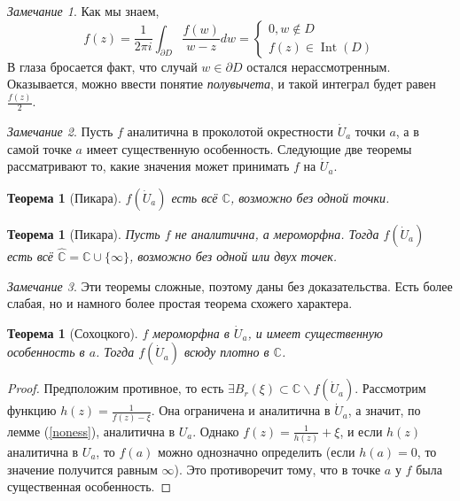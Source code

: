 \documentclass[12pt]{article}
\renewcommand{\C}{\mathbb{C}}
\newcommand{\Int}{\operatorname{Int}}
\newcommand{\union}{\cup}
\newcounter{cnt}
\theoremstyle{thmnote}
\newtheorem{theorem}[cnt]{Теорема}
\theoremstyle{remark}
\newtheorem*{remark}{Замечание}
\theoremstyle{defnote}
\begin{document}
\begin{remark}
    Как мы знаем,
    \begin{equation*}
        f(z) = \frac{1}{2 \pi i} \int_{\partial D} \frac{f(w)}{w - z} dw = \begin{cases}
            0, w \notin D \\ f(z) \in \Int(D)
        \end{cases}
    \end{equation*}
    В глаза бросается факт, что случай $w \in \partial D$ остался нерассмотренным. Оказывается, можно ввести понятие \textit{полувычета}, и такой интеграл будет равен $\frac{f(z)}{2}$.
\end{remark}

\begin{remark}
    Пусть $f$ аналитична в проколотой окрестности $\dot{U}_a$ точки $a$, а в самой точке $a$ имеет существенную особенность. Следующие две теоремы рассматривают то, какие значения может принимать $f$ на $\dot{U}_a$.
\end{remark}

\begin{theorem}[Пикара]
    $f(\dot{U}_a)$ есть всё $\C$, возможно без одной точки.
\end{theorem}

\begin{theorem}[Пикара]
    Пусть $f$ не аналитична, а мероморфна. Тогда $f(\dot{U}_a)$ есть всё $\hat{\C} = \C \union \{\infty\}$, возможно без одной или двух точек.
\end{theorem}

\begin{remark}
    Эти теоремы сложные, поэтому даны без доказательства. Есть более слабая, но и намного более простая теорема схожего характера.
\end{remark}

\begin{theorem}[Сохоцкого]
    $f$ мероморфна в $\dot{U}_a$, и имеет существенную особенность в $a$. Тогда $f(\dot{U}_a)$ всюду плотно в $\C$.
\end{theorem}
\begin{proof}
    Предположим противное, то есть $\exists B_r(\xi) \subset \C \backslash f(\dot{U}_a)$. Рассмотрим функцию $h(z) = \frac{1}{f(z) - \xi}$. Она ограничена и аналитична в $\dot{U}_a$, а значит, по лемме (\ref{noness}), аналитична в $U_a$. Однако $f(z) = \frac{1}{h(z)} + \xi$, и если $h(z)$ аналитична в $U_a$, то $f(a)$ можно однозначно определить (если $h(a) = 0$, то значение получится равным $\infty$). Это противоречит тому, что в точке $a$ у $f$ была существенная особенность.
\end{proof}
\end{document}
